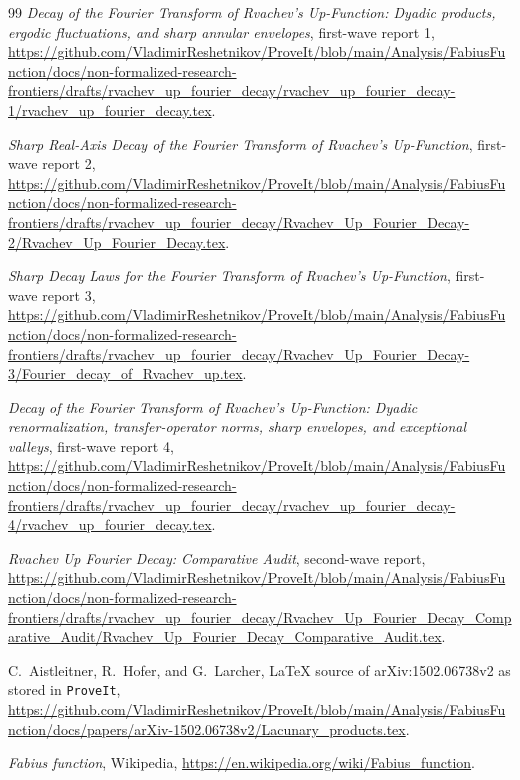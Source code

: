\documentclass[11pt]{article}
\theoremstyle{definition}
\theoremstyle{remark}
\begin{document}
\begin{thebibliography}{99}
\emph{Decay of the Fourier Transform of Rvachev's Up-Function: Dyadic products,
ergodic fluctuations, and sharp annular envelopes}, first-wave report 1,
\url{https://github.com/VladimirReshetnikov/ProveIt/blob/main/Analysis/FabiusFunction/docs/non-formalized-research-frontiers/drafts/rvachev_up_fourier_decay/rvachev_up_fourier_decay-1/rvachev_up_fourier_decay.tex}.

\emph{Sharp Real-Axis Decay of the Fourier Transform of Rvachev's Up-Function},
first-wave report 2,
\url{https://github.com/VladimirReshetnikov/ProveIt/blob/main/Analysis/FabiusFunction/docs/non-formalized-research-frontiers/drafts/rvachev_up_fourier_decay/Rvachev_Up_Fourier_Decay-2/Rvachev_Up_Fourier_Decay.tex}.

\emph{Sharp Decay Laws for the Fourier Transform of Rvachev's Up-Function},
first-wave report 3,
\url{https://github.com/VladimirReshetnikov/ProveIt/blob/main/Analysis/FabiusFunction/docs/non-formalized-research-frontiers/drafts/rvachev_up_fourier_decay/Rvachev_Up_Fourier_Decay-3/Fourier_decay_of_Rvachev_up.tex}.

\emph{Decay of the Fourier Transform of Rvachev's Up-Function: Dyadic
renormalization, transfer-operator norms, sharp envelopes, and exceptional valleys},
first-wave report 4,
\url{https://github.com/VladimirReshetnikov/ProveIt/blob/main/Analysis/FabiusFunction/docs/non-formalized-research-frontiers/drafts/rvachev_up_fourier_decay/rvachev_up_fourier_decay-4/rvachev_up_fourier_decay.tex}.

\emph{Rvachev Up Fourier Decay: Comparative Audit}, second-wave report,
\url{https://github.com/VladimirReshetnikov/ProveIt/blob/main/Analysis/FabiusFunction/docs/non-formalized-research-frontiers/drafts/rvachev_up_fourier_decay/Rvachev_Up_Fourier_Decay_Comparative_Audit/Rvachev_Up_Fourier_Decay_Comparative_Audit.tex}.

C.~Aistleitner, R.~Hofer, and G.~Larcher,
LaTeX source of arXiv:1502.06738v2 as stored in \texttt{ProveIt},
\url{https://github.com/VladimirReshetnikov/ProveIt/blob/main/Analysis/FabiusFunction/docs/papers/arXiv-1502.06738v2/Lacunary_products.tex}.

\emph{Fabius function}, Wikipedia,
\url{https://en.wikipedia.org/wiki/Fabius_function}.

\end{thebibliography}
\end{document}
